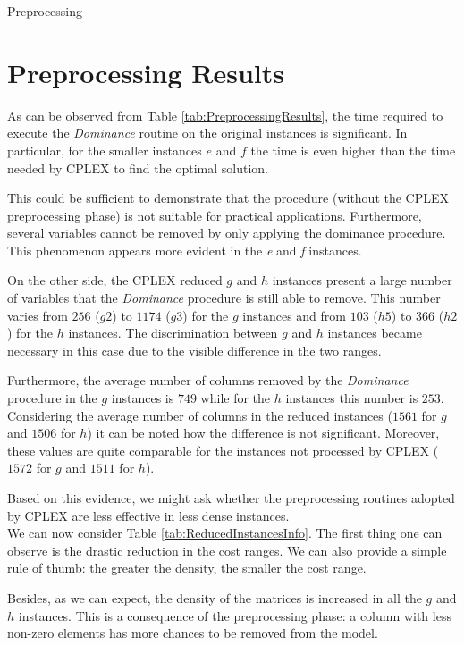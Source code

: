 \documentclass[a4paper,12pt]{mydeitesi_eng}
\begin{document}
\begin{chapter}{Preprocessing}
\section{Preprocessing Results}
\label{sec:PreprocessingResults}

As can be observed from Table \ref{tab:PreprocessingResults}, the time required to execute the \emph{Dominance} routine on the original instances is significant.
In particular, for the smaller instances $e$ and $f$ the time is even higher than the time needed by CPLEX to find the optimal solution.

This could be sufficient to demonstrate that the procedure (without the CPLEX preprocessing phase) is not suitable for practical applications.
Furthermore, several variables cannot be removed by only applying the dominance procedure.
This phenomenon appears more evident in the \emph{e} and \emph{f} instances.

On the other side, the CPLEX reduced $g$ and $h$ instances present a large number of variables that the \emph{Dominance} procedure is still able to remove.
This number varies from $256$ ($g2$) to $1174$ ($g3$) for the $g$ instances and from $103$ ($h5$) to $366$ ($h2$) for the $h$ instances.
The discrimination between $g$ and $h$ instances became necessary in this case due to the visible difference in the two ranges.

Furthermore, the average number of columns removed by the \emph{Dominance} procedure in the $g$ instances is $749$ while for the $h$ instances this number is $253$.
Considering the average number of columns in the reduced instances ($1561$ for $g$ and $1506$ for $h$) it can be noted how the difference is not significant. Moreover, these values are quite comparable for the instances not processed by CPLEX ($1572$ for $g$ and $1511$ for $h$).

Based on this evidence, we might ask whether the preprocessing routines adopted by CPLEX are less effective in less dense instances.\\

We can now consider Table \ref{tab:ReducedInstancesInfo}.
The first thing one can observe is the drastic reduction in the cost ranges.
We can also provide a simple rule of thumb: the greater the density, the smaller the cost range.


Besides, as we can expect, the density of the matrices is increased in all the $g$ and $h$ instances.
This is a consequence of the preprocessing phase: a column with less non-zero elements has more chances to be removed from the model.\\


\end{chapter}
\end{document}
